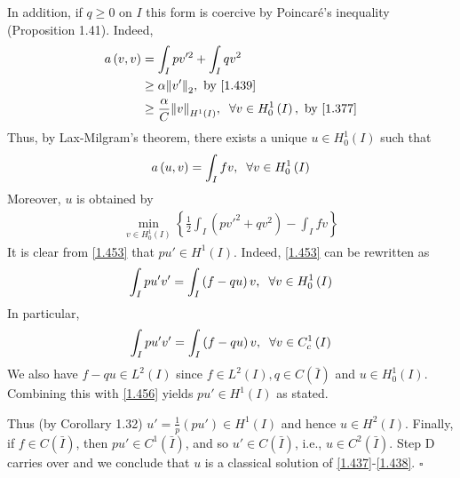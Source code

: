 \documentclass[a4paper,oneside]{book}
\numberwithin{equation}{chapter}
\begin{document}
In addition, if $q\ge 0$ on $I$ this form is coercive by Poincar\'{e}'s inequality (Proposition 1.41). Indeed, 
\begin{align}
a\left( {v,v} \right) &= \int_I {pv{'^2}}  + \int_I {q{v^2}} \\
& \ge \alpha {\left\| {v'} \right\|_2},\mbox{ by \eqref{1.439}}\\
& \ge \frac{\alpha }{C}{\left\| v \right\|_{{H^1}\left( I \right)}},\hspace{0.2cm}\forall v \in H_0^1\left( I \right),\mbox{ by \eqref{1.377}}
\end{align}
Thus, by Lax-Milgram's theorem, there exists a unique $u\in H_0^1\left(I\right)$ such that
\begin{align}
\label{1.453}
a\left( {u,v} \right) = \int_I {fv} ,\hspace{0.2cm}\forall v \in H_0^1\left( I \right)
\end{align}
Moreover, $u$ is obtained by 
\begin{align}
\mathop {\min }\limits_{v \in H_0^1\left( I \right)} \left\{ {\frac{1}{2}\int_I {\left( {pv{'^2} + q{v^2}} \right)}  - \int_I {fv} } \right\}
\end{align}
It is clear from \eqref{1.453} that $pu'\in H^1\left(I\right)$. Indeed, \eqref{1.453} can be rewritten as
\begin{align}
\int_I {pu'v'}  = \int_I {\left( {f - qu} \right)v} ,\hspace{0.2cm} \forall v \in H_0^1\left( I \right)
\end{align}
In particular, 
\begin{align}
\label{1.456}
\int_I {pu'v'}  = \int_I {\left( {f - qu} \right)v} ,\hspace{0.2cm} \forall v \in C_c^1\left( I \right)
\end{align}
We also have $f-qu\in L^2\left(I\right)$ since $f\in L^2\left(I\right), q\in C\left(\bar I\right)$ and $u\in H_0^1\left(I\right)$. Combining this with \eqref{1.456} yields $pu'\in H^1\left(I\right)$ as stated. 

Thus (by Corollary 1.32) $u' = \frac{1}{p}\left( {pu'} \right) \in {H^1}\left(I\right)$ and hence $u\in H^2\left(I\right)$. Finally, if $f\in C\left(\bar I\right)$, then $pu'\in C^1\left(\bar I\right)$, and so $u'\in C\left(\bar I\right)$, i.e., $u\in C^2\left(\bar I\right)$. Step D carries over and we conclude that $u$ is a classical solution of \eqref{1.437}-\eqref{1.438}. \hfill $\square$\\
\end{document}

